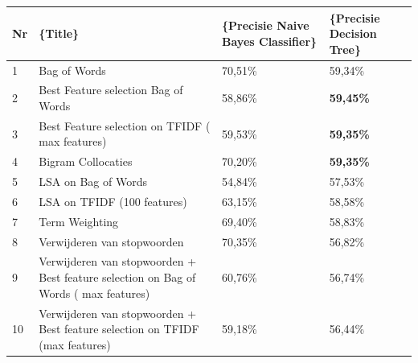 \begin{table}[h]
\centering
\begin{adjustbox}{width=1\textwidth}
\begin{tabular}{|l|l|l|l|}
\hline
{\bf Nr} & {\bf \{\bf Title\}}                                                                  & \{\bf Precisie Naive Bayes Classifier\} & \{\bf Precisie Decision Tree\} \\ \hline
1        & Bag of Words                                                                         & 70,51\%                                 & 59,34\%                        \\ \hline
2        & Best Feature selection Bag of Words                                                  & 58,86\%                                 & {\bf 59,45\%}                  \\ \hline
3        & Best Feature selection on TFIDF ( max features)                                      & 59,53\%                                 & {\bf 59,35\%}                  \\ \hline
4        & Bigram Collocaties                                                                   & 70,20\%                                 & {\bf 59,35\%}                  \\ \hline
5        & LSA on Bag of Words                                                                  & 54,84\%                                 & 57,53\%                        \\ \hline
6        & LSA on TFIDF (100 features)                                                          & 63,15\%                                 & 58,58\%                        \\ \hline
7        & Term Weighting                                                                       & 69,40\%                                 & 58,83\%                        \\ \hline
8        & Verwijderen van stopwoorden                                                          & 70,35\%                                 & 56,82\%                        \\ \hline
9        & Verwijderen van stopwoorden + Best feature selection on Bag of Words ( max features) & 60,76\%                                 & 56,74\%                        \\ \hline
10       & Verwijderen van stopwoorden + Best feature selection on TFIDF (max features)         & 59,18\%                                 & 56,44\%                        \\ \hline

\end{tabular}
\end{adjustbox}
\end{table}

